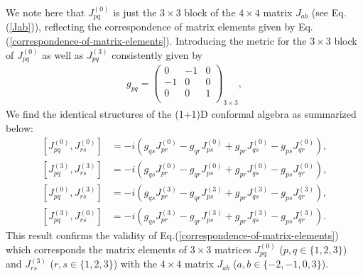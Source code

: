 \documentclass[%
 reprint,
superscriptaddress,
 amsmath,amssymb,
 aps,
]{revtex4-2}
\begin{document}
We note here that $J^{(0)}_{p q}$ is just the $3\times3$ block of the $4\times4$ matrix $J_{ab}$ (see Eq.(\ref{Jab})), reflecting the correspondence of matrix elements given by Eq.(\ref{correspondence-of-matrix-elements}).   
Introducing the metric for the $3\times3$ block of $J^{(0)}_{p q}$ as well as $J^{(3)}_{p q}$ consistently given by   
\begin{align}
      g_{pq}=\begin{pmatrix}
  0&-1&0\\
  -1&0&0\\
  0&0&1\\
  \end{pmatrix}_{3\times3},
  \end{align}
We find the identical structures of the (1+1)D conformal algebra
as summarized below:
\begin{align}
      \left[J^{(0)}_{{p}{q}},J^{(0)}_{{r}{s}}\right]&=-i\left(g_{{q}{s}}J^{(0)}_{{p}{r}}-g_{{q}{r}}J^{(0)}_{{p}{s}}+g_{{p}{r}}J^{(0)}_{{q}{s}}-g_{{p}{s}}J^{(0)}_{{q}{r}}\right),\label{algebraJpq1}\\
      \left[J^{(3)}_{{p}{q}},J^{(3)}_{{r}{s}}\right]&=-i\left(g_{{q}{s}}J^{(0)}_{{p}{r}}-g_{{q}{r}}J^{(0)}_{{p}{s}}+g_{{p}{r}}J^{(0)}_{{q}{s}}-g_{{p}{s}}J^{(0)}_{{q}{r}}\right),\label{algebraJpq2}\\
      \left[J^{(0)}_{{p}{q}},J^{(3)}_{{r}{s}}\right]&=-i\left(g_{{q}{s}}J^{(3)}_{{p}{r}}-g_{{q}{r}}J^{(3)}_{{p}{s}}+g_{{p}{r}}J^{(3)}_{{q}{s}}-g_{{p}{s}}J^{(3)}_{{q}{r}}\right),\label{algebraJpq3}\\
      \left[J^{(3)}_{{p}{q}},J^{(0)}_{{r}{s}}\right]&=-i\left(g_{{q}{s}}J^{(3)}_{{p}{r}}-g_{{q}{r}}J^{(3)}_{{p}{s}}+g_{{p}{r}}J^{(3)}_{{q}{s}}-g_{{p}{s}}J^{(3)}_{{q}{r}}\right)\label{algebraJpq4}.
  \end{align}
This result confirms the validity of Eq.(\ref{correspondence-of-matrix-elements}) which corresponds the matrix elements of $3\times3$ matrices
 $J^{(0)}_{pq}$ ($p,q\in\{1,2,3\}$) and $J^{(3)}_{rs}$ ($r,s\in\{1,2,3\}$) with the $4\times4$ matrix $J_{ab}$ ($a,b\in\{-2,-1,0,3\}$).
\end{document}
